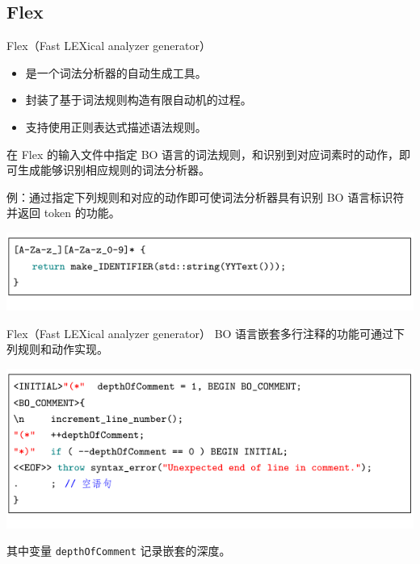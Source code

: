 \documentclass[dvipsnames, svgnames, x11names]{beamer}
\begin{document}
\subsection{Flex}
\begin{frame}{Flex（Fast LEXical analyzer generator）}
    \begin{itemize}[<+->]
        \item 是一个词法分析器的自动生成工具。
        \item 封装了基于词法规则构造有限自动机的过程。
        \item 支持使用正则表达式描述语法规则。
    \end{itemize}

    \vspace{\baselineskip}
    \onslide<+-> 在 Flex 的输入文件中指定 BO 语言的词法规则，和识别到对应词素时的动作，即可生成能够识别相应规则的词法分析器。
    
    \vspace{\baselineskip}
    \onslide<+-> 例：通过指定下列规则和对应的动作即可使词法分析器具有识别 BO 语言标识符并返回 token 的功能。

    \begin{center}
        \onslide<+->\includegraphics{../figure/flex1.pdf}
    \end{center}
\end{frame}

\begin{frame}{Flex（Fast LEXical analyzer generator）}
    \onslide<+->BO 语言嵌套多行注释的功能可通过下列规则和动作实现。
    
    \begin{center}
        \onslide<+->\includegraphics{../figure/flex2.pdf}
    \end{center}

    \onslide<+->其中变量 \texttt{depthOfComment} 记录嵌套的深度。
\end{frame}
\end{document}
